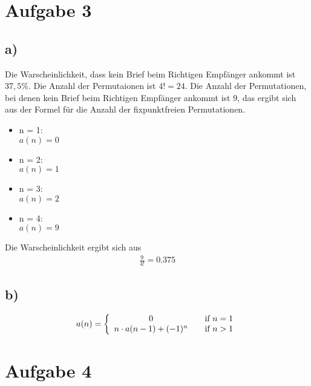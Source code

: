 \documentclass[a4paper]{scrartcl}
\begin{document}
\newpage
\section*{Aufgabe 3}
\subsection*{a)}
Die Warscheinlichkeit, dass kein Brief beim Richtigen Empfänger ankommt ist $37,5\%$.
Die Anzahl der Permutaionen ist $4! = 24$.
Die Anzahl der Permutationen, bei denen kein Brief beim Richtigen Empfänger ankommt ist $9$, das ergibt sich aus der Formel 
für die Anzahl der fixpunktfreien Permutationen. 
\begin{itemize}
    \item n = 1: \\ 
    $ a(n) = 0 $
    \item n = 2: \\
    $ a(n) = 1 $
    \item n = 3: \\
    $ a(n) = 2 $
    \item n = 4: \\
    $ a(n) = 9 $
\end{itemize}
Die Warscheinlichkeit ergibt sich aus
\begin{align*}
    \frac{9}{4!} = 0.375
\end{align*}

\subsection*{b)}
\begin{align*}
    a(n) = \left\{ 
        \begin{array}{ c l }
            0 & \quad \textrm{if } n = 1 \\
            n \cdot a(n-1) + (-1)^n & \quad \textrm{if } n > 1 \\
        \end{array}
    \right.
\end{align*}

\section*{Aufgabe 4}
\end{document}
